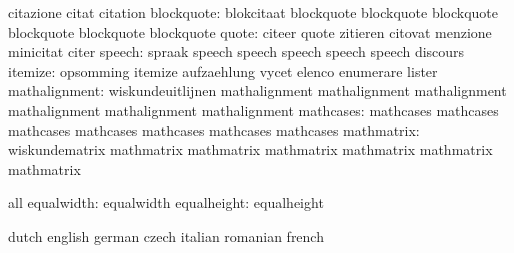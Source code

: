                            citazione                 citat
                           citation
               blockquote: blokcitaat                blockquote
                           blockquote                blockquote
                           blockquote                blockquote
                           blockquote
                    quote: citeer                    quote
                           zitieren                  citovat
                           menzione                  minicitat
                           citer
                   speech: spraak                    speech
                           speech                    speech
                           speech                    speech
                           discours
                  itemize: opsomming                 itemize
                           aufzaehlung               vycet
                           elenco                    enumerare
                           lister
            mathalignment: wiskundeuitlijnen         mathalignment
                           mathalignment             mathalignment
                           mathalignment             mathalignment
                           mathalignment
                mathcases: mathcases                 mathcases
                           mathcases                 mathcases
                           mathcases                 mathcases
                           mathcases
               mathmatrix: wiskundematrix            mathmatrix
                           mathmatrix                mathmatrix
                           mathmatrix                mathmatrix
                           mathmatrix

\stopvariables




\startconstants  all
     equalwidth: equalwidth
    equalheight: equalheight
\stopconstants


\startconstants            dutch                     english
                           german                    czech
                           italian                   romanian
                           french

